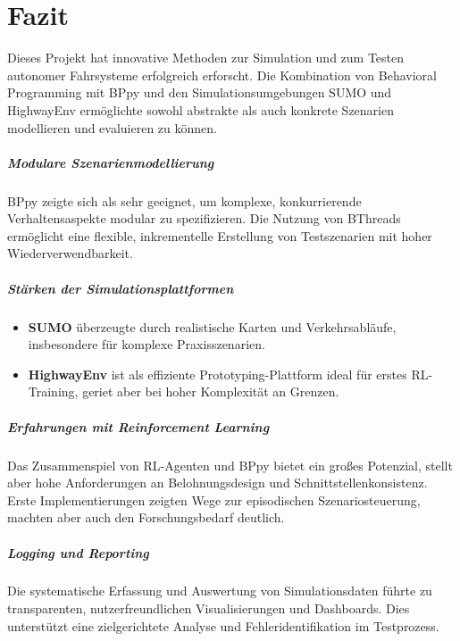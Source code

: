 \chapter{Fazit}

Dieses Projekt hat innovative Methoden zur Simulation und zum Testen autonomer Fahrsysteme erfolgreich erforscht. Die Kombination von Behavioral Programming mit BPpy und den Simulationsumgebungen SUMO und HighwayEnv ermöglichte sowohl abstrakte als auch konkrete Szenarien modellieren und evaluieren zu können.

\paragraph{Modulare Szenarienmodellierung}
BPpy zeigte sich als sehr geeignet, um komplexe, konkurrierende Verhaltensaspekte modular zu spezifizieren. Die Nutzung von BThreads ermöglicht eine flexible, inkrementelle Erstellung von Testszenarien mit hoher Wiederverwendbarkeit.

\paragraph{Stärken der Simulationsplattformen}
\begin{itemize}
    \item \textbf{SUMO} überzeugte durch realistische Karten und Verkehrsabläufe, insbesondere für komplexe Praxisszenarien.
    \item \textbf{HighwayEnv} ist als effiziente Prototyping-Plattform ideal für erstes RL-Training, geriet aber bei hoher Komplexität an Grenzen.
\end{itemize}

\paragraph{Erfahrungen mit Reinforcement Learning}
Das Zusammenspiel von RL-Agenten und BPpy bietet ein großes Potenzial, stellt aber hohe Anforderungen an Belohnungsdesign und Schnittstellenkonsistenz. Erste Implementierungen zeigten Wege zur episodischen Szenariosteuerung, machten aber auch den Forschungsbedarf deutlich.

\paragraph{Logging und Reporting}
Die systematische Erfassung und Auswertung von Simulationsdaten führte zu transparenten, nutzerfreundlichen Visualisierungen und Dashboards. Dies unterstützt eine zielgerichtete Analyse und Fehleridentifikation im Testprozess.

